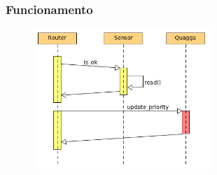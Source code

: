 
\begin{frame}
	\frametitle{Funcionamento}

	\begin{figure}[h]
		\centering
		\includegraphics[width=0.6\textwidth]{"../Relatorio/Artigo IoT-G4/figs/sequencia"}
		\label{sequencia}
 	\end{figure}
\end{frame}


